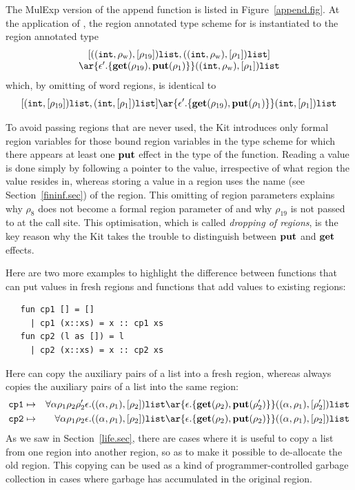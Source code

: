 \documentclass[12pt]{book}
\newcommand{\rhoword}{\rho_{\rm w}}
\begin{document}
The MulExp version of the append function is listed in
Figure~\ref{append.fig}. At the application of , the region
annotated type scheme for  is instantiated to the region annotated type
$$ \begin{array}{c}[ ((\boxml{int},\rhoword),[\rho_{19}])\boxml{list},
      ((\boxml{int},\rhoword),[\rho_1])\boxml{list} ]  \\
\ar{\epsilon'.\{\Get(\rho_{19}),\Put(\rho_1)\}} ((\boxml{int},\rhoword),[\rho_1])\boxml{list}
\end{array} $$
which, by omitting of word regions, is identical to
$$[ (\boxml{int},[\rho_{19}])\boxml{list},
      (\boxml{int},[\rho_1])\boxml{list} ]
\ar{\epsilon'.\{\Get(\rho_{19}),\Put(\rho_1)\}} (\boxml{int},[\rho_1])\boxml{list} $$

To avoid passing regions that are never used, the Kit introduces only
formal region variables for those bound region variables in the type
scheme for which there appears at least one
%
$\mathop{\bf put}\nolimits$ effect in the type of the function.  Reading a value is done
simply by following a pointer to the value, irrespective of what
region the value resides in, whereas storing a value in a region uses
the name (see Section~\ref{fininf.sec}) of the region.  This omitting
of region parameters explains why $\rho_8$ does not become a formal
region parameter of  and why $\rho_{19}$ is not passed to
 at the call site. This optimisation, which is called
%
{\em dropping of regions}, is the key reason why the Kit takes the
trouble to distinguish between $\mathop{\bf put}\nolimits$ and 
%
$\mathop{\bf get}\nolimits$ \label{bother-to-distinguish-get-n-put}effects.

Here are two more examples to highlight the difference between
functions that can put values in fresh regions and functions that add
values to existing regions:
\begin{verbatim}
   fun cp1 [] = []   
     | cp1 (x::xs) = x :: cp1 xs
   fun cp2 (l as []) = l
     | cp2 (x::xs) = x :: cp2 xs
\end{verbatim}
Here  can copy the auxiliary pairs of a list into a fresh
region, whereas  always copies the auxiliary pairs of a
list into the same region:
\begin{eqnarray*}
\boxml{cp1}&\mapsto&\forall\alpha\rho_1\rho_2\rho_2'\epsilon.
     ((\alpha,\rho_1),[\rho_2])\boxml{list} \ar{\epsilon.\{\Get(\rho_2),
           \Put(\rho_2')\}} ((\alpha,\rho_1),[\rho_2'])\boxml{list}\\
\boxml{cp2}&\mapsto&\forall\alpha\rho_1\rho_2\epsilon.
     ((\alpha,\rho_1),[\rho_2])\boxml{list} \ar{\epsilon.\{\Get(\rho_2),
           \Put(\rho_2)\}} ((\alpha,\rho_1),[\rho_2])\boxml{list}
\end{eqnarray*}
As we saw in Section~\ref{life.sec}, there are cases where it is
useful to copy a list from one region into another region, so as to
make it possible to de-allocate the old region. This copying can be
used as a kind of programmer-controlled garbage collection in cases
where garbage has accumulated in the original region.
\end{document}
